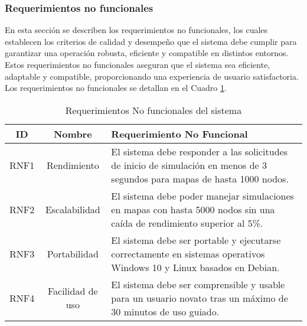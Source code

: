 \subsubsection{Requerimientos no funcionales}

    En esta secci\'on se describen los requerimientos no 
        funcionales, los cuales establecen los criterios de calidad y 
        desempe\~no que el sistema debe cumplir para garantizar una operaci\'on 
        robusta, eficiente y compatible en distintos entornos. Estos 
        requerimientos no funcionales aseguran que el sistema sea eficiente, 
        adaptable y compatible, proporcionando una experiencia de usuario 
        satisfactoria. Los requerimientos no funcionales se detallan en el Cuadro \ref{tab:requerimientos_no_funcionales}.
    \vskip 0.5cm
    \begin{table}[h!]
        \centering
        \begin{tabular}{|c|c|p{12cm}|}
        \hline
        \textbf{ID} & \textbf{Nombre} &\textbf{Requerimiento No Funcional} \\
        \hline
        RNF1 & Rendimiento & El sistema debe responder a las solicitudes de inicio de simulaci\'on en menos de 3 segundos para mapas de hasta 1000 nodos. \\
        \hline
        RNF2 & Escalabilidad & El sistema debe poder manejar simulaciones en mapas con hasta 5000 nodos sin una ca\'ida de rendimiento superior al 5\%. \\
        \hline
        RNF3 & Portabilidad & El sistema debe ser portable y ejecutarse correctamente en sistemas operativos Windows 10 y Linux basados en Debian. \\
        \hline
        RNF4 & Facilidad de uso & El sistema debe ser comprensible y usable para un usuario novato tras un m\'aximo de 30 minutos de uso guiado. \\
        \hline
        \end{tabular}
        \caption{Requerimientos No funcionales del sistema}
        \label{tab:requerimientos_no_funcionales}
    \end{table}